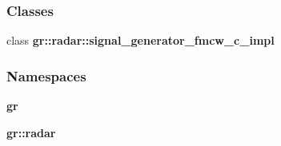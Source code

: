 \subsubsection*{Classes}
\begin{DoxyCompactItemize}
\item 
class {\bf gr\+::radar\+::signal\+\_\+generator\+\_\+fmcw\+\_\+c\+\_\+impl}
\end{DoxyCompactItemize}
\subsubsection*{Namespaces}
\begin{DoxyCompactItemize}
\item 
 {\bf gr}
\item 
 {\bf gr\+::radar}
\end{DoxyCompactItemize}
